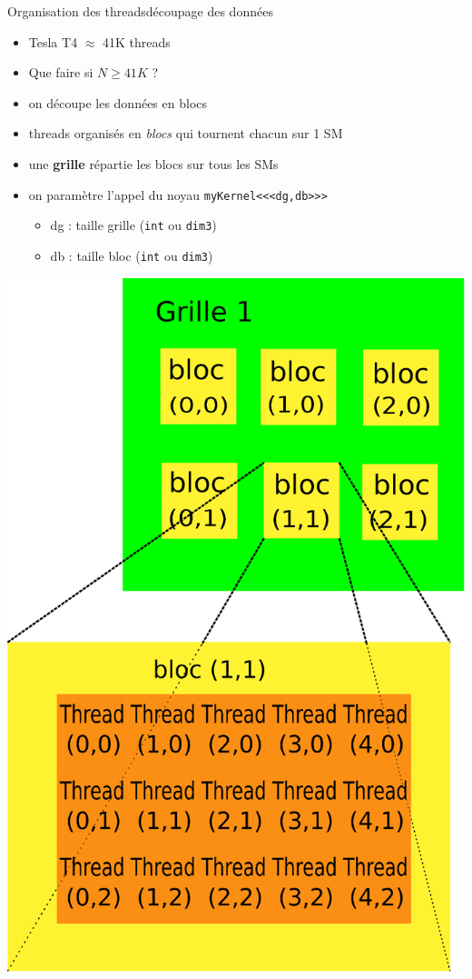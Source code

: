 \documentclass[11pt,mathserif]{beamer}
\newcommand{\scout}{\faAngellist}
\newcommand{\galde}{\faQuestion}
\newcommand{\argi}{\faLightbulbO}
\begin{document}
\begin{frame}{Organisation des threads}{découpage des données}
 \pause
 \begin{minipage}[c]{0.59\linewidth}
  \begin{itemize}[<+->]
    \item[\argi] Tesla T4 $\approx$ 41K threads 
    \item[\galde] Que faire si $N \geq 41K$ ?
    \item[\scout] on découpe les données en blocs
    \item[\argi] threads organisés en {\em blocs} qui tournent chacun sur 1 SM
    \item[\argi] une {\bf grille} répartie les blocs sur tous les SMs
    \item[\argi] on paramètre l'appel du noyau \texttt{myKernel<<<dg,db>>>} 
      \begin{itemize}
        \item dg : taille grille (\texttt{int} ou \texttt{dim3})
        \item db : taille bloc (\texttt{int} ou \texttt{dim3})
      \end{itemize}
  \end{itemize}
\end{minipage}
\begin{minipage}[c]{0.39\linewidth}
\begin{center}
  \includegraphics[width=0.8\linewidth]{fig/grille_et_blocs.eps}
\end{center}
\end{minipage}
\end{frame}
\end{document}
